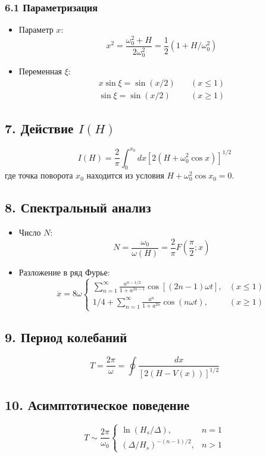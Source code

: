 \documentclass[10pt]{article}
\begin{document}
\subsubsection*{6.1 Параметризация}
\begin{itemize}
    \item Параметр $x$:
    \[x^{2} = \frac{\omega_{0}^{2} + H}{2 \omega_{0}^{2}} = \frac{1}{2}(1 + H / \omega_{0}^{2})\]
    \item Переменная $\xi$:
    \begin{align*}
    x \sin \xi = \sin (x / 2) &\quad (x \leq 1)\\
    \sin \xi = \sin (x / 2) &\quad (x \geq 1)
    \end{align*}
\end{itemize}

\subsection*{7. Действие $I(H)$}
\begin{equation}
I(H) = \frac{2}{\pi} \int_{0}^{x_{0}} d x \left[2\left(H + \omega_{0}^{2} \cos x\right)\right]^{1/2}
\end{equation}
где точка поворота $x_{0}$ находится из условия $H + \omega_{0}^{2} \cos x_{0} = 0$.

\subsection*{8. Спектральный анализ}
\begin{itemize}
    \item Число $N$:
    \[N = \frac{\omega_{0}}{\omega(H)} = \frac{2}{\pi} F\left(\frac{\pi}{2}; x\right)\]
    
    \item Разложение в ряд Фурье:
    \[
    \dot{x} = 8 \omega \begin{cases}
    \sum_{n=1}^{\infty} \frac{a^{n-1/2}}{1+a^{2n-1}} \cos [(2n-1) \omega t], & (x \leq 1)\\
    1/4 + \sum_{n=1}^{\infty} \frac{a^{n}}{1+a^{2n}} \cos (n \omega t), & (x \geq 1)
    \end{cases}
    \]
\end{itemize}

\subsection*{9. Период колебаний}
\begin{equation}
T = \frac{2 \pi}{\omega} = \oint \frac{d x}{[2(H-V(x))]^{1/2}}
\end{equation}

\subsection*{10. Асимптотическое поведение}
\begin{equation}
T \sim \frac{2 \pi}{\omega_{0}} \begin{cases}
\ln(H_{s}/\Delta), & n=1\\
(\Delta/H_{s})^{-(n-1)/2}, & n>1
\end{cases}
\end{equation}
\end{document}
